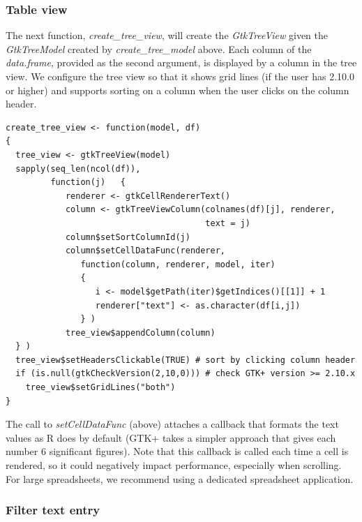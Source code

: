 \documentclass[article]{jss}
\begin{document}
\subsubsection{Table view}

The next function, \emph{create\_tree\_view},  will create the
\emph{GtkTreeView} given the \emph{GtkTreeModel} created by
\emph{create\_tree\_model} above. Each column of the \emph{data.frame},
provided as the second argument, is displayed by a column in the tree
view. We configure the tree view so that it shows grid lines (if the
user has  2.10.0 or higher) and supports sorting on a column
when the user clicks on the column header.
\begin{verbatim}
create_tree_view <- function(model, df)
{
  tree_view <- gtkTreeView(model)
  sapply(seq_len(ncol(df)),
         function(j)   {
            renderer <- gtkCellRendererText()
            column <- gtkTreeViewColumn(colnames(df)[j], renderer,
                                        text = j)
            column$setSortColumnId(j)
            column$setCellDataFunc(renderer,
               function(column, renderer, model, iter)
               {
                  i <- model$getPath(iter)$getIndices()[[1]] + 1
                  renderer["text"] <- as.character(df[i,j])
               } )
            tree_view$appendColumn(column)
  } )
  tree_view$setHeadersClickable(TRUE) # sort by clicking column header
  if (is.null(gtkCheckVersion(2,10,0))) # check GTK+ version >= 2.10.x
    tree_view$setGridLines("both")
}
\end{verbatim}
The call to \emph{setCellDataFunc} (above) attaches a callback that formats the text values as R does by default (GTK+ takes a simpler approach that gives each number 6 significant figures). Note that this callback is called each time a cell is rendered, so it could negatively impact performance, especially when scrolling. For large spreadsheets, we recommend using a dedicated spreadsheet application. 


\subsubsection{Filter text entry}
\end{document}
